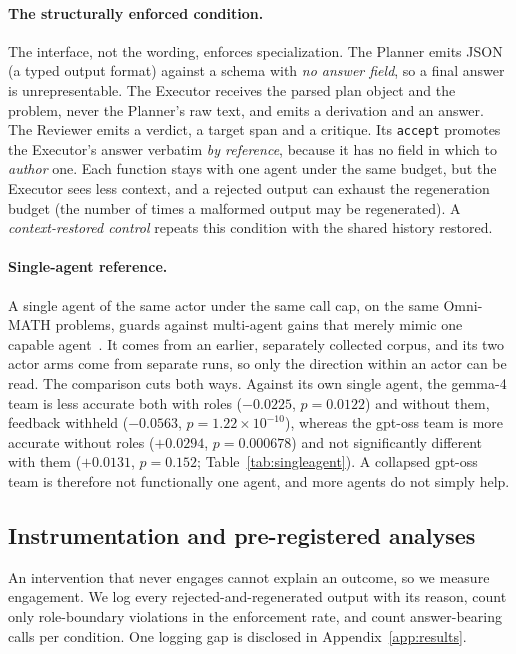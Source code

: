 \paragraph{The structurally enforced condition.} The interface, not the wording, enforces
specialization. The Planner emits JSON (a typed output format) against a
schema with \emph{no answer field}, so a final answer is unrepresentable.
The Executor receives the parsed plan object and the problem, never the
Planner's raw text, and emits a derivation and an answer. The Reviewer emits
a verdict, a target span and a critique. Its \texttt{accept} promotes the
Executor's answer verbatim \emph{by reference}, because it has no field in
which to \emph{author} one. Each function stays with one agent under the
same budget, but the Executor sees less context, and a rejected output can
exhaust the regeneration budget (the number of times a malformed output may
be regenerated). A \emph{context-restored control} repeats this condition
with the shared history restored.


\paragraph{Single-agent reference.} A single agent of the same actor under
the same call cap, on the same Omni-MATH problems, guards against
multi-agent gains that merely mimic one capable
agent~\cite{zhang2026rethinking}. It comes from an earlier, separately
collected corpus, and its two actor arms come from separate runs, so only
the direction within an actor can be read. The comparison cuts both ways.
Against its own single agent, the gemma-4 team is less accurate both with
roles (${-}0.0225$, $p=0.0122$) and without them, feedback withheld
(${-}0.0563$, $p=1.22\times10^{-10}$), whereas the gpt-oss team is more accurate without roles
(${+}0.0294$, $p=0.000678$) and not significantly different with them
(${+}0.0131$, $p=0.152$; Table~\ref{tab:singleagent}). A collapsed gpt-oss team is therefore
not functionally one agent, and more agents do not simply help.

\subsection{Instrumentation and pre-registered analyses}

An intervention that never engages cannot explain an outcome, so we measure
engagement. We log every rejected-and-regenerated output with its reason,
count only role-boundary violations in the enforcement rate, and count
answer-bearing calls per condition. One logging gap is disclosed in
Appendix~\ref{app:results}.

